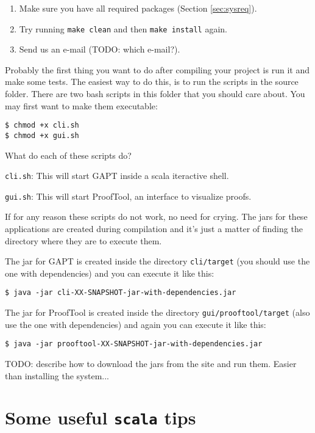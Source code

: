 \documentclass[a4paper, 11pt]{report}
\begin{document}
\begin{enumerate}
\item Make sure you have all required packages (Section \ref{sec:sysreq}).
\item Try running \texttt{make clean} and then \texttt{make install} again.
\item Send us an e-mail ({\color{red}TODO}: which e-mail?).
\end{enumerate}

Probably the first thing you want to do after compiling your project is run it
and make some tests. The easiest way to do this, is to run the scripts in the
source folder. There are two bash scripts in this folder that you should care
about. You may first want to make them executable:

\begin{lstlisting}
$ chmod +x cli.sh
$ chmod +x gui.sh
\end{lstlisting}

What do each of these scripts do?

\texttt{cli.sh}: This will start GAPT inside a scala iteractive shell.

\texttt{gui.sh}: This will start ProofTool, an interface to visualize proofs.

If for any reason these scripts do not work, no need for crying.
The jars for these applications are created during compilation
and it's just a matter of finding the directory where they are to execute them.

The jar for GAPT is created inside the directory \texttt{cli/target} (you
should use the one with dependencies) and you can execute it like this:

\begin{lstlisting}
$ java -jar cli-XX-SNAPSHOT-jar-with-dependencies.jar
\end{lstlisting}

The jar for ProofTool is created inside the directory
\texttt{gui/prooftool/target} (also use the one with dependencies) and again you
can execute it like this:

\begin{lstlisting}
$ java -jar prooftool-XX-SNAPSHOT-jar-with-dependencies.jar
\end{lstlisting}

{\color{red}TODO}: describe how to download the jars from the site and run them. Easier than
installing the system...

\section{Some useful \texttt{scala} tips}
\end{document}
